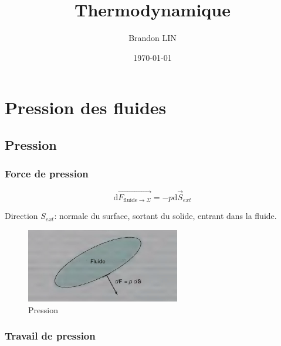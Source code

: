 \documentclass{report}
\title{\Huge{Thermodynamique}}
\author{\huge{Brandon LIN}}
\date{\today}
\begin{document}
\maketitle
\newpage%
\tableofcontents
\pagebreak


\chapter{Pression des fluides} %
\label{chap:Pression des fluides}

\section{Pression} %
\label{sec:Pression}

\subsection{Force de pression} %
\label{sub:Force de pression}

\begin{equation}
  \mathrm{d} \overrightarrow{F _{\text{fluide} \to \Sigma}}= - p \mathrm{d}\overrightarrow{S} _{ext}
\end{equation}

\begin{note}{}{}
Direction $S _{ext}$: normale du surface, sortant du solide, entrant dans la fluide.
\end{note}



\begin{figure}[H] %
  \centering
  \includegraphics[width=0.6\textwidth]{./assets/Pression.png}
  \caption{Pression}
\end{figure}

\subsection{Travail de pression} %
\label{sub:Travail de pression}
\end{document}
